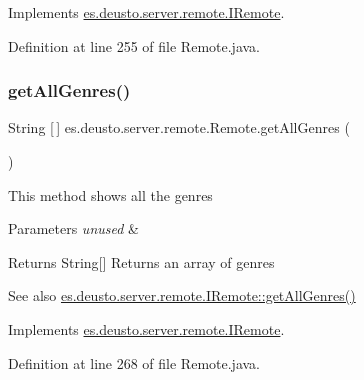 Implements \hyperlink{interfacees_1_1deusto_1_1server_1_1remote_1_1_i_remote_a43ab8347d64e5d49093e607029f2598b}{es.\+deusto.\+server.\+remote.\+I\+Remote}.



Definition at line 255 of file Remote.\+java.

\mbox{\label{classes_1_1deusto_1_1server_1_1remote_1_1_remote_a89ce5459e2ebe375dc534e59eda91b74}} 
\subsubsection{\texorpdfstring{get\+All\+Genres()}{getAllGenres()}}
{\footnotesize\ttfamily String \mbox{[}$\,$\mbox{]} es.\+deusto.\+server.\+remote.\+Remote.\+get\+All\+Genres (\begin{DoxyParamCaption}{ }\end{DoxyParamCaption})}

This method shows all the genres 
\begin{DoxyParams}{Parameters}
{\em unused} & \\
\hline
\end{DoxyParams}
\begin{DoxyReturn}{Returns}
String\mbox{[}\mbox{]} Returns an array of genres 
\end{DoxyReturn}
\begin{DoxySeeAlso}{See also}
\hyperlink{interfacees_1_1deusto_1_1server_1_1remote_1_1_i_remote_a7c3721ee532d20aa65b892b55f157b21}{es.\+deusto.\+server.\+remote.\+I\+Remote\+::get\+All\+Genres()} 
\end{DoxySeeAlso}


Implements \hyperlink{interfacees_1_1deusto_1_1server_1_1remote_1_1_i_remote_a7c3721ee532d20aa65b892b55f157b21}{es.\+deusto.\+server.\+remote.\+I\+Remote}.



Definition at line 268 of file Remote.\+java.

\mbox{\label{classes_1_1deusto_1_1server_1_1remote_1_1_remote_a09318956131f355c8b43f93e3c3afea4}} 
